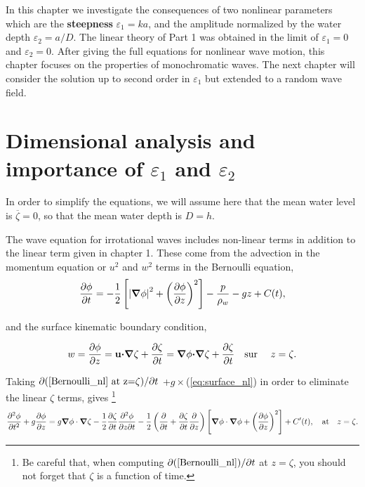 In this chapter we investigate the consequences of two nonlinear parameters which are the   \textbf{steepness} $\varepsilon_1= k a$, and the amplitude normalized by the water depth $\varepsilon_2= a/D$. 
The linear theory of Part 1 was obtained in the limit of $\varepsilon_1=0$ and $\varepsilon_2=0$. After giving the full equations for nonlinear wave motion, this chapter focuses on the properties 
of monochromatic waves. The next chapter will consider the solution up to second order in $\varepsilon_1$ but extended to a random wave field. 



\section{Dimensional analysis and importance of $\varepsilon_1$ and $\varepsilon_2$ }
In order to simplify the equations, we will assume here that the mean water level is  $\overline{\zeta}=0$, so that the mean water depth is  $D=h$. 

The wave equation for irrotational waves includes non-linear terms in addition to the linear term given in chapter 1. These come from the 
advection in the momentum equation or $u^2$ and $w^2$ terms in the Bernoulli equation,  
\begin{equation}
    \frac{\partial \phi}{\partial t}=
    -\frac{1}{2}\left[
    \left|\mbox{\boldmath $\nabla$} \phi\right|^2
    +\left(\frac{\partial \phi}{\partial z}\right)^2
    \right]
    -\frac{p}{\rho_w}-g z + C(t),\label{Bernoulli_nl}
\end{equation}

and the surface kinematic boundary condition, 

\begin{equation}
    w=\frac{\partial \phi }{\partial z}= {\mathbf u}\mbox{\boldmath $\cdot$} \mbox{\boldmath $\nabla$} \zeta + \frac{\partial \zeta }{\partial t}= \mbox{\boldmath $\nabla$} {\mathbf \phi}\mbox{\boldmath $\cdot$}\mbox{\boldmath $\nabla$} \zeta
    + \frac{\partial \zeta }{\partial t}
    \quad \mbox{sur\ }\quad z=\zeta.  \label{eq:surface_nl}
\end{equation}

Taking $\partial (\ref{Bernoulli_nl} \textrm{~at~z=}\zeta)/\partial t $
+$g\times$(\ref{eq:surface_nl}) in order to eliminate the linear $\zeta$ terms, gives \footnote{Be careful that, when computing 
$\partial (\ref{Bernoulli_nl})/\partial t$ at $z=\zeta$, you should not forget that  $\zeta$ is a function of time.}
\begin{equation}
  \frac{\partial^2{\phi}}{\partial{t^2}}+g\frac{\partial\phi}{\partial z}=
g\mbox{\boldmath $\nabla$}\phi \cdot \mbox{\boldmath $\nabla$}\zeta - \frac{1}{2}\frac{\partial \zeta}{\partial
t}\frac{\partial^2 \phi}{\partial z \partial t}-  \frac{1}{2} \left(\frac{\partial }{\partial t}+\frac{\partial
\zeta}{\partial t}\frac{\partial }{\partial z}\right) \left[\mbox{\boldmath $\nabla$}\phi \cdot
{\mbox{\boldmath $\nabla$}\phi} + \left(\frac{\partial\phi}{\partial
z}\right)^2\right]+C'(t), \quad \mbox{at}
\quad  z=\zeta. \label{surface comb}
\end{equation}

